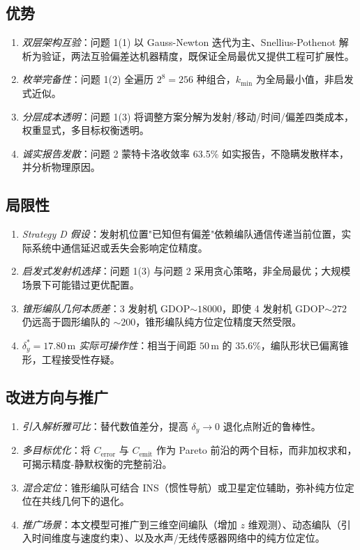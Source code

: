 \documentclass[12pt,a4paper]{ctexart}
\newcommand{\unit}[1]{\ensuremath{\,\mathrm{#1}}}
\begin{document}
\subsection{优势}

\begin{enumerate}[label=(\arabic*), leftmargin=2em]
    \item \emph{双层架构互验}：问题 1(1) 以 Gauss-Newton 迭代为主、Snellius-Pothenot 解析为验证，两法互验偏差达机器精度，既保证全局最优又提供工程可扩展性。
    \item \emph{枚举完备性}：问题 1(2) 全遍历 $2^8=256$ 种组合，$k_{\min}$ 为全局最小值，非启发式近似。
    \item \emph{分层成本透明}：问题 1(3) 将调整方案分解为发射/移动/时间/偏差四类成本，权重显式，多目标权衡透明。
    \item \emph{诚实报告发散}：问题 2 蒙特卡洛收敛率 63.5\% 如实报告，不隐瞒发散样本，并分析物理原因。
\end{enumerate}

\subsection{局限性}

\begin{enumerate}[label=(\arabic*), leftmargin=2em]
    \item \emph{Strategy D 假设}：发射机位置"已知但有偏差"依赖编队通信传递当前位置，实际系统中通信延迟或丢失会影响定位精度。
    \item \emph{启发式发射机选择}：问题 1(3) 与问题 2 采用贪心策略，非全局最优；大规模场景下可能错过更优配置。
    \item \emph{锥形编队几何本质差}：3 发射机 GDOP$\sim 18000$，即使 4 发射机 GDOP$\sim 272$ 仍远高于圆形编队的 $\sim 200$，锥形编队纯方位定位精度天然受限。
    \item \emph{$\delta_y^*=17.80\unit{m}$ 实际可操作性}：相当于间距 $50\unit{m}$ 的 $35.6\%$，编队形状已偏离锥形，工程接受性存疑。
\end{enumerate}

\subsection{改进方向与推广}

\begin{enumerate}[label=(\arabic*), leftmargin=2em]
    \item \emph{引入解析雅可比}：替代数值差分，提高 $\delta_y\to 0$ 退化点附近的鲁棒性。
    \item \emph{多目标优化}：将 $C_{\text{error}}$ 与 $C_{\text{emit}}$ 作为 Pareto 前沿的两个目标，而非加权求和，可揭示精度-静默权衡的完整前沿。
    \item \emph{混合定位}：锥形编队可结合 INS（惯性导航）或卫星定位辅助，弥补纯方位定位在共线几何下的退化。
    \item \emph{推广场景}：本文模型可推广到三维空间编队（增加 $z$ 维观测）、动态编队（引入时间维度与速度约束）、以及水声/无线传感器网络中的纯方位定位。
\end{enumerate}
\end{document}
